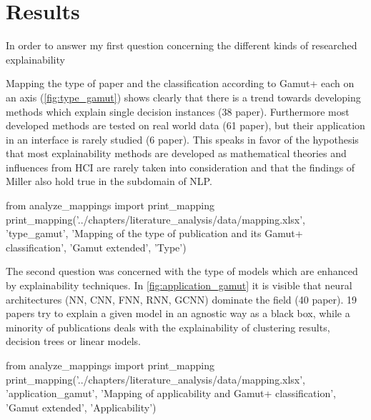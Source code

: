 \section{Results}

In order to answer my first question concerning the different kinds of researched explainability 

Mapping the type of paper and the classification according to Gamut+ each on an axis (\autoref{fig:type_gamut}) shows clearly that there is a trend towards developing methods which explain single decision instances (38 paper). Furthermore most developed methods are tested on real world data (61 paper), but their application in an interface is rarely studied (6 paper). This speaks in favor of the hypothesis that most explainability methods are developed as mathematical theories and influences from HCI are rarely taken into consideration and that the findings of Miller \cite{millerExplainableAIBeware2017} also hold true in the subdomain of NLP.

\begin{pycode}
from analyze_mappings import print_mapping
print_mapping('../chapters/literature_analysis/data/mapping.xlsx', 'type_gamut', 'Mapping of the type of publication and its Gamut+ classification', 'Gamut extended', 'Type')
\end{pycode}

The second question was concerned with the type of models which are enhanced by explainability techniques. In \autoref{fig:application_gamut} it is visible that neural architectures (NN, CNN, FNN, RNN, GCNN) dominate the field (40 paper). 19 papers try to explain a given model in an agnostic way as a black box, while a minority of publications deals with the explainability of clustering results, decision trees or linear models.

\begin{pycode}
from analyze_mappings import print_mapping
print_mapping('../chapters/literature_analysis/data/mapping.xlsx', 'application_gamut', 'Mapping of applicability and Gamut+ classification', 'Gamut extended', 'Applicability')
\end{pycode}

